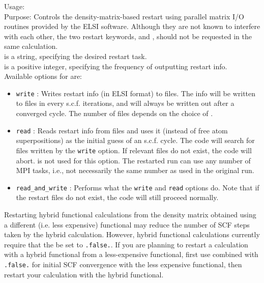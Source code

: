 {
  \noindent
  Usage:    \\[1.0ex]
  Purpose: Controls the density-matrix-based restart using parallel matrix I/O
    routines provided by the ELSI software. Although they are not known to
    interfere with each other, the two restart keywords,  and
    , should not be requested in the same calculation. \\[1.0ex]
   is a string, specifying the desired restart task. \\[1.0ex]
   is a positive integer, specifying the frequency of outputting
    restart info. \\
}
Available options for  are:
\begin{itemize}
  \item \texttt{write} : Writes restart info (in ELSI format) to files. The info
    will be written to files in every  s.c.f. iterations, and will
    always be written out after a converged cycle. The number of files depends
    on the choice of .
  \item \texttt{read} : Reads restart info from files and uses it (instead of
    free atom superpositions) as the initial guess of an s.c.f. cycle. The code
    will search for files written by the \texttt{write} option. If relevant
    files do not exist, the code will abort.  is not used for this
    option. The restarted run can use any number of MPI tasks, i.e., not
    necessarily the same number as used in the original run.
  \item \texttt{read\_and\_write} : Performs what the \texttt{write} and
    \texttt{read} options do. Note that if the restart files do not exist, the
    code will still proceed normally.
\end{itemize}

Restarting hybrid functional calculations from the density matrix obtained using
a different (i.e. less expensive) functional may reduce the number of SCF
steps taken by the hybrid calculation. However, hybrid functional calculations
currently require that the  be set to
\texttt{.false.}. If you are planning to restart a calculation with a hybrid
functional from a less-expensive functional, first use 
combined with  \texttt{.false.} for initial
SCF convergence with the less expensive functional, then restart your
calculation with the hybrid functional.

